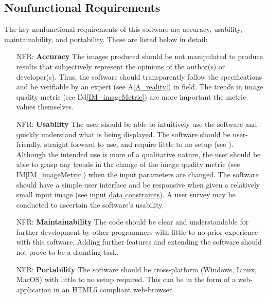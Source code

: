 \documentclass[12pt]{article}
\newcommand{\aref}[1]{A\ref{#1}}
\newcommand{\iref}[1]{IM\ref{#1}}
\newcounter{nfrnum} %
\begin{document}
\subsection{Nonfunctional Requirements}

The key nonfunctional requirements of this software are accuracy, usability, 
maintainability, and portability. These are listed below in detail:

\noindent \begin{itemize}

\item[NFR\refstepcounter{nfrnum}\thenfrnum \label{NFR_Accuracy}:]
  \textbf{Accuracy} The images produced should be not manipulated to produce 
  results that subjectively represent the opinions of the author(s) or 
  developer(s). Thus, the software should transparently follow the 
  specifications and be verifiable by an expert (see \aref{A_reality}) in field. The trends in image 
  quality metric (see \iref{IM_imageMetric}) are more important the metric values themselves.

\item[NFR\refstepcounter{nfrnum}\thenfrnum \label{NFR_Usability}:] \textbf{Usability} The user should be able to intuitively use the 
  software and quickly understand what is being displayed. The software should be user-friendly, 
  straight forward to use, and require little to no setup (see \citet{VnV_report}).
  Although the intended use is more of a qualitative nature, the user should be able to grasp any 
  trends in the change of the image quality metric (see \iref{IM_imageMetric}) when the input parameters are 
  changed. The software should have a simple user interface and be responsive 
  when given a relatively small input image (see \hyperref[sec_DataConstraints]{input data constraints}).
  A user survey may be conducted to ascertain the software's usability.

\item[NFR\refstepcounter{nfrnum}\thenfrnum \label{NFR_Maintainability}:]
  \textbf{Maintainability} The code should be clear and understandable for further 
  development by other programmers with little to no prior experience with this software.
  Adding further features and extending the software should not prove to be a daunting task.

\item[NFR\refstepcounter{nfrnum}\thenfrnum \label{NFR_Portability}:]
  \textbf{Portability} The software should be cross-platform (Windows, Linux, 
  MacOS) with little to no setup required. This can be in the form of a 
  web-application in an HTML5 compliant web-browser.

\end{itemize}
\end{document}
